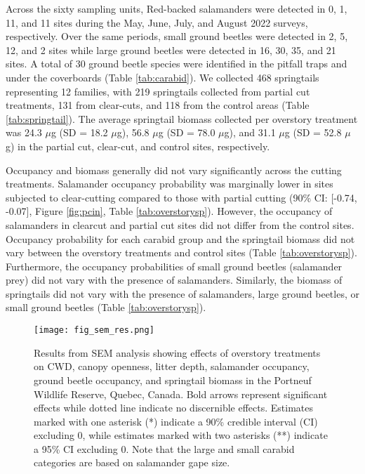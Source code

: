 \vspace{10pt}

Across the sixty sampling units, Red-backed salamanders were detected in 0, 1, 11, and 11 sites during the May, June, July, and August 2022 surveys, respectively. 
Over the same periods, small ground beetles were detected in 2, 5, 12, and 2 sites while large ground beetles were detected in 16, 30, 35, and 21 sites.
A total of 30 ground beetle species were identified in the pitfall traps and under the coverboards (Table \ref{tab:carabid}). 
We collected 468 springtails representing 12 families, with 219 springtails collected from partial cut treatments, 131 from clear-cuts, and 118 from the control areas (Table \ref{tab:springtail}). 
The average springtail biomass collected per overstory treatment was 24.3 $\mu$g (SD = 18.2 $\mu$g), 56.8 $\mu$g (SD = 78.0 $\mu$g), and 31.1 $\mu$g (SD = 52.8 $\mu$g) in the partial cut, clear-cut, and control sites, respectively. 

Occupancy and biomass generally did not vary significantly across the cutting treatments. 
Salamander occupancy probability was marginally lower in sites subjected to clear-cutting compared to those with partial cutting (90\% CI: [-0.74, -0.07], Figure \ref{fig:pcin}, Table \ref{tab:overstorysp}). 
However, the occupancy of salamanders in clearcut and partial cut sites did not differ from the control sites. 
Occupancy probability for each carabid group and the springtail biomass did not vary between the overstory treatments and control sites (Table \ref{tab:overstorysp}). 
Furthermore, the occupancy probabilities of small ground beetles (salamander prey) did not vary with the presence of salamanders. 
Similarly, the biomass of springtails did not vary with the presence of salamanders, large ground beetles, or small ground beetles (Table \ref{tab:overstorysp}).

\begin{figure}[h!]
	\centering
	\texttt{[image: fig\_sem\_res.png]}
	\caption[Results from structural equation modeling analysis revealing effects of overstory treatments on coarse woody debris volume,
  canopy openness, litter depth, salamander occupancy, ground beetle occupancy, and springtail biomass.]
  {Results from SEM analysis showing effects of overstory treatments on CWD, 
  canopy openness, litter depth, salamander occupancy, ground beetle occupancy, and springtail biomass in the Portneuf Wildlife Reserve, 
  Quebec, Canada. Bold arrows represent significant effects while dotted line indicate no discernible effects. 
  Estimates marked with one asterisk (*) indicate a 90\% credible interval (CI) excluding 0, while estimates marked with two asterisks (**) indicate a 95\% CI excluding 0. 
  Note that the large and small carabid categories are based on salamander gape size.}
	\label{fig:SEMres}
\end{figure}  

